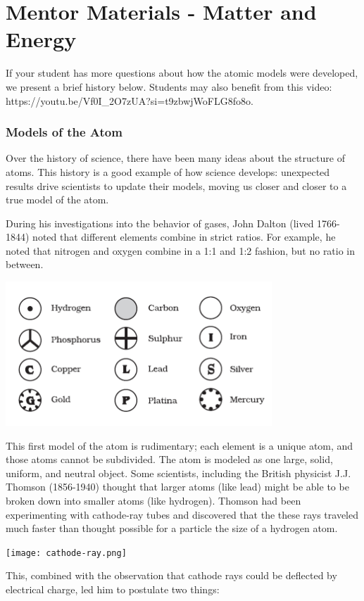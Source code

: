 \chapter{Mentor Materials - Matter and Energy}

If your student has more questions about how the atomic models were developed, 
we present a brief history below. Students may also benefit from this video: 
https://youtu.be/Vf0I_2O7zUA?si=t9zbwjWoFLG8fo8o.


\subsection{Models of the Atom}
Over the history of science, there have been many ideas about the structure of
atoms. This history is a good example of how science develops: unexpected
results drive scientists to update their models, moving us closer and closer to
a true model of the atom.

During his investigations into the behavior of gases,
John Dalton (lived 1766-1844) noted that different elements combine in strict
ratios. For example, he noted that nitrogen and oxygen combine in a 1:1 and 1:2
fashion, but no ratio in between.

\includegraphics[width=0.75\textwidth]{daltons_model.png}

This first model of the atom is rudimentary; each element is a unique atom,
and those atoms cannot be subdivided. The atom is modeled as one large, solid, 
uniform, and neutral object. Some scientists, including the British physicist 
J.J. Thomson (1856-1940) thought that larger atoms (like lead) might be able 
to be broken down into smaller atoms (like hydrogen). Thomson had been 
experimenting with cathode-ray tubes and discovered that the these rays 
traveled much faster than thought possible for a particle the size of a 
hydrogen atom.

\texttt{[image: cathode-ray.png]}

This, combined with the observation that cathode rays could be deflected by
electrical charge, led him to postulate two things:

